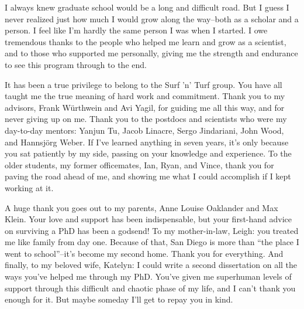 \begin{frontmatter}
%
\tableofcontents
\listoffigures  %
\listoftables   %



%
%
\begin{acknowledgements}
I always knew graduate school would be a long and difficult road. But I
guess I never realized just how much I would grow along the way--both
as a scholar and a person. I feel like I'm hardly the same person I was when
I started. I owe tremendous thanks to the people who helped me learn
and grow as a scientist, and to those who
supported me personally, giving me the strength and endurance to see
this program through to the end.

It has been a true privilege to belong to the Surf 'n' Turf
group. You have all taught me the true meaning of hard work and
commitment. Thank you to my advisors, Frank W\"{u}rthwein and Avi
Yagil, for guiding me all this way, and for never giving up on
me. Thank you to the postdocs and scientists who were my day-to-day
mentors: Yanjun Tu, Jacob Linacre, Sergo Jindariani, John Wood, and
Hannsj\"{o}rg Weber. If I've learned anything in seven years, it's
only because you sat patiently by my side, passing on your knowledge
and experience. To the older students, my former officemates, Ian,
Ryan, and Vince, thank you for paving the road ahead of me, and showing me
what I could accomplish if I kept working at it.

A huge thank you goes out to my parents, Anne Louise Oaklander and Max
Klein. Your love and support has been indispensable, but your
first-hand advice on surviving a PhD has been a godsend!
To my mother-in-law, Leigh: you treated me like family from day one.
Because of that, San Diego is more than ``the place I went to
school''--it's become my second home. Thank you for everything.
And finally, to my beloved wife, Katelyn: I could write a second
dissertation on all the ways you've helped me through my PhD.
You've given me superhuman levels of support through this difficult
and chaotic phase of my life, and I can't thank you enough for
it. But maybe someday I'll get to repay you in kind.


\end{acknowledgements}
\end{frontmatter}
